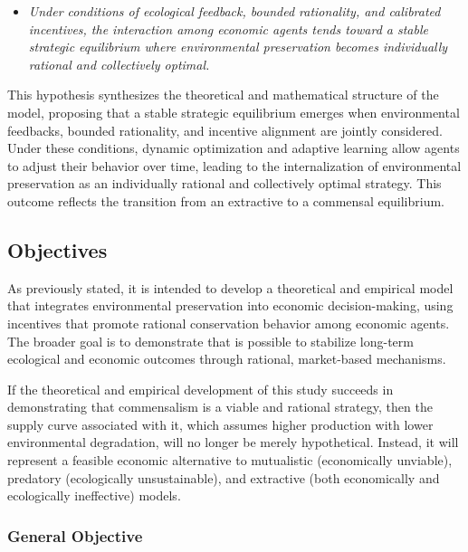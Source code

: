 \begin{itemize}  

    \item[\textbf{H5.}]
    
    \textit{Under conditions of ecological feedback, bounded rationality, and calibrated incentives, the interaction among economic agents tends toward a stable strategic equilibrium where environmental preservation becomes individually rational and collectively optimal.}
\end{itemize}

This hypothesis synthesizes the theoretical and mathematical structure of the model, proposing that a stable strategic equilibrium emerges when environmental feedbacks, bounded rationality, and incentive alignment are jointly considered. Under these conditions, dynamic optimization and adaptive learning allow agents to adjust their behavior over time, leading to the internalization of environmental preservation as an individually rational and collectively optimal strategy. This outcome reflects the transition from an extractive to a commensal equilibrium.

\subsection{Objectives}

As previously stated, it is intended to develop a theoretical and empirical model that integrates environmental preservation into economic decision-making, using incentives that promote rational conservation behavior among economic agents. The broader goal is to demonstrate that is possible to stabilize long-term ecological and economic outcomes through rational, market-based mechanisms.

If the theoretical and empirical development of this study succeeds in demonstrating that commensalism is a viable and rational strategy, then the supply curve associated with it, which assumes higher production with lower environmental degradation, will no longer be merely hypothetical. Instead, it will represent a feasible economic alternative to mutualistic (economically unviable), predatory (ecologically unsustainable), and extractive (both economically and ecologically ineffective) models. 

\subsubsection{General Objective}


